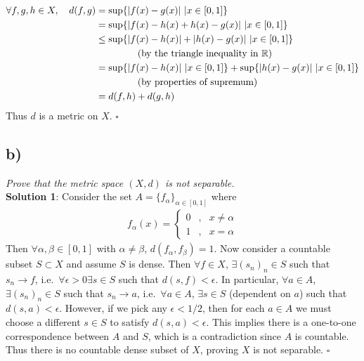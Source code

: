 \documentclass[12pt]{article}
\begin{document}
\begin{align*}
  \forall f,g,h \in X,\ \ \ d(f,g) &= \sup\{\abs{f(x) - g(x)}\ | x \in [0,1]\} \\
  &= \sup\{\abs{f(x) - h(x) + h(x) - g(x)}\ | x \in [0,1]\} \\
  &\leq \sup\{\abs{f(x) - h(x)} + \abs{h(x) - g(x)}\ | x \in [0,1]\} \\
  &\hphantom{mmmmm} \text{(by the triangle inequality in $\mathbb{R}$)}\\
  &= \sup\{\abs{f(x) - h(x)}\ | x \in [0,1]\} + \sup\{\abs{h(x) - g(x)}\ | x \in [0,1]\} \\
  &\hphantom{mmmmm} \text{(by properties of supremum)} \\
  &= d(f, h) + d(g, h)
\end{align*}
Thus $d$ is a metric on $X$. \hfill $\square$

\subsection*{ b)}
{\it Prove that the metric space $(X, d)$ is not separable.} \\

\noindent\textbf{Solution 1}: Consider the set $A = \{f_{\alpha}\}_{\alpha \in [0,1]}$ where
\begin{align*}
  f_{\alpha}(x) = \left\{\begin{array}{lcl}
    0 &,& x \neq \alpha \\
    1 &,& x = \alpha
  \end{array}\right.
\end{align*}
Then $\forall \alpha,\beta \in [0,1]$ with $\alpha \neq \beta$, $d(f_{\alpha}, f_{\beta}) = 1$.  Now consider a countable subset $S \subset X$ and assume $S$ is dense.  Then $\forall f \in X$, $\exists (s_n)_n \in S$ such that $s_n \rightarrow f$, i.e.~$\forall \epsilon > 0 \exists s\in S$ such that $d(s, f) < \epsilon$.  In particular, $\forall a \in A$, $\exists (s_n)_n \in S$ such that $s_n \rightarrow a$, i.e.~$\forall a \in A$, $\exists s \in S$ (dependent on $a$) such that $d(s, a) < \epsilon$.  However, if we pick any $\epsilon < 1/2$, then for each $a \in A$ we must choose a different $s \in S$ to satisfy $d(s, a) < \epsilon$.  This implies there is a one-to-one correspondence between $A$ and $S$, which is a contradiction since $A$ is countable.  Thus there is no countable dense subset of $X$, proving $X$ is not separable. \hfill $\square$ \\
\end{document}
